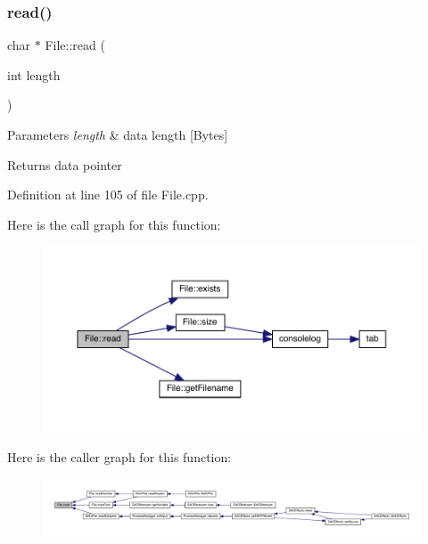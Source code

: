 \subsubsection{\texorpdfstring{read()}{read()}}
{\footnotesize\ttfamily char $\ast$ File\+::read (\begin{DoxyParamCaption}\item[{int}]{length }\end{DoxyParamCaption})}


\begin{DoxyParams}{Parameters}
{\em length} & data length \mbox{[}Bytes\mbox{]} \\
\hline
\end{DoxyParams}
\begin{DoxyReturn}{Returns}
data pointer 
\end{DoxyReturn}


Definition at line 105 of file File.\+cpp.

Here is the call graph for this function\+:
\nopagebreak
\begin{figure}[H]
\begin{center}
\leavevmode
\includegraphics[width=350pt]{class_file_a917f13960e83613e5cb36d433b4cd833_cgraph}
\end{center}
\end{figure}
Here is the caller graph for this function\+:
\nopagebreak
\begin{figure}[H]
\begin{center}
\leavevmode
\includegraphics[width=350pt]{class_file_a917f13960e83613e5cb36d433b4cd833_icgraph}
\end{center}
\end{figure}
\mbox{\label{class_file_ab13f46c198a890f679351a2c9030e36d}} 
